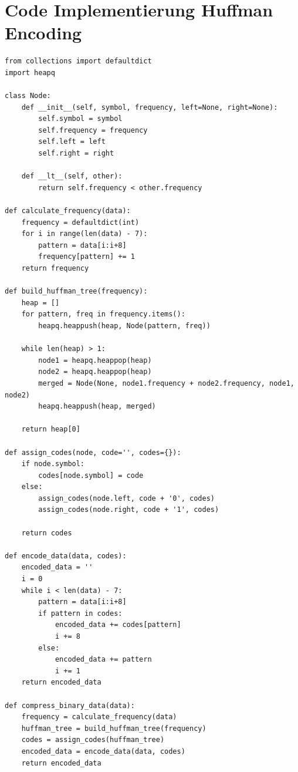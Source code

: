 \documentclass{ffhsthesis}
\begin{document}
\section{Code Implementierung Huffman Encoding}
\label{code:huffman}
\begin{verbatim}
from collections import defaultdict
import heapq

class Node:
    def __init__(self, symbol, frequency, left=None, right=None):
        self.symbol = symbol
        self.frequency = frequency
        self.left = left
        self.right = right

    def __lt__(self, other):
        return self.frequency < other.frequency

def calculate_frequency(data):
    frequency = defaultdict(int)
    for i in range(len(data) - 7):
        pattern = data[i:i+8]
        frequency[pattern] += 1
    return frequency

def build_huffman_tree(frequency):
    heap = []
    for pattern, freq in frequency.items():
        heapq.heappush(heap, Node(pattern, freq))

    while len(heap) > 1:
        node1 = heapq.heappop(heap)
        node2 = heapq.heappop(heap)
        merged = Node(None, node1.frequency + node2.frequency, node1, node2)
        heapq.heappush(heap, merged)

    return heap[0]

def assign_codes(node, code='', codes={}):
    if node.symbol:
        codes[node.symbol] = code
    else:
        assign_codes(node.left, code + '0', codes)
        assign_codes(node.right, code + '1', codes)

    return codes

def encode_data(data, codes):
    encoded_data = ''
    i = 0
    while i < len(data) - 7:
        pattern = data[i:i+8]
        if pattern in codes:
            encoded_data += codes[pattern]
            i += 8
        else:
            encoded_data += pattern
            i += 1
    return encoded_data

def compress_binary_data(data):
    frequency = calculate_frequency(data)
    huffman_tree = build_huffman_tree(frequency)
    codes = assign_codes(huffman_tree)
    encoded_data = encode_data(data, codes)
    return encoded_data
\end{verbatim}
\end{document}
